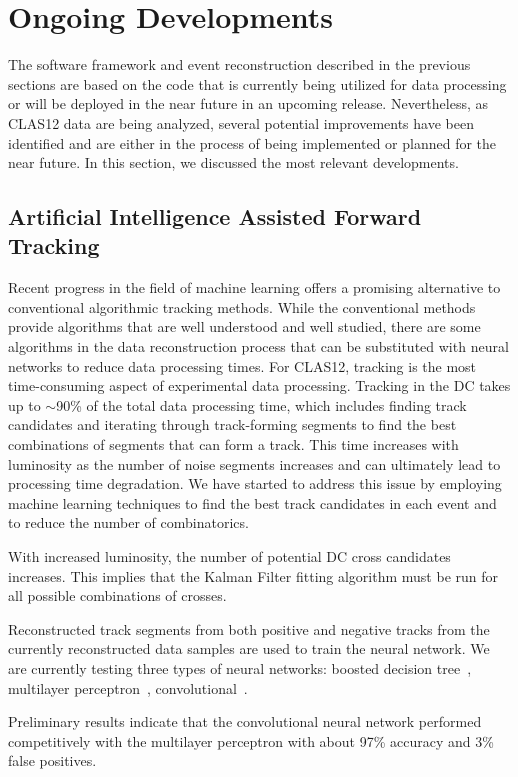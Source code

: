 \section{Ongoing Developments}

The software framework and event reconstruction described in the previous sections are based on the code that
is currently being utilized for data processing or will be deployed in the near future in an upcoming release.
Nevertheless, as CLAS12 data are being analyzed, several potential improvements have been identified and are
either in the process of being implemented or planned for the near future. In this section, we discussed the most
relevant developments.

\subsection{Artificial Intelligence Assisted Forward Tracking}

Recent progress in the field of machine learning offers a promising alternative to conventional algorithmic tracking
methods. While the conventional methods provide algorithms that are well understood and well studied, there are
some algorithms in the data reconstruction process that can be substituted with neural networks to reduce data
processing times. For CLAS12, tracking is the most time-consuming aspect of experimental data processing.
Tracking in the DC takes up to $\sim$90\% of the total data processing time, which includes finding track
candidates and iterating through track-forming segments to find the best combinations of segments that can form
a track. This time increases with luminosity as the number of noise segments increases and can ultimately lead to
processing time degradation. We have started to address this issue by employing machine learning techniques
to find the best track candidates in each event and to reduce the number of combinatorics.

With increased luminosity, the number of potential DC cross candidates increases. This implies that the Kalman
Filter fitting algorithm must be run for all possible combinations of crosses. 

Reconstructed track segments from both positive and negative tracks from the currently reconstructed data
samples are used to train the neural network. We are currently testing three types of neural networks: boosted
decision tree~\cite{bdt}, multilayer perceptron~\cite{mp}, convolutional~\cite{cnn}. 

Preliminary results indicate that the convolutional neural network performed competitively with the multilayer
perceptron with about 97\% accuracy and 3\% false positives. 

